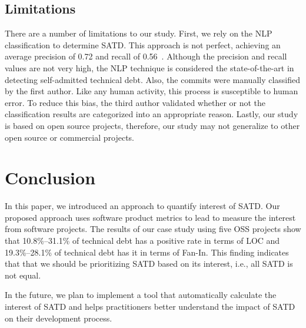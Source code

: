 \documentclass[10pt, conference]{IEEEtran}
\newcommand{\emad}[1]{{\color{red}{\textbf{Emad: [#1]}}}}
\begin{document}

\subsection{Limitations} \label{limitations}
There are a number of limitations to our study. First, we rely on the NLP classification to determine SATD. This approach is not perfect, achieving an average precision of 0.72 and recall of 0.56~\cite{Maldonado_TSE2017}. Although the precision and recall values are not very high, the NLP technique is considered the state-of-the-art in detecting self-admitted technical debt. Also, the commits were manually classified by the first author. Like any human activity, this process is susceptible to human error. To reduce this bias, the third author validated whether or not the classification results are categorized into an appropriate reason. Lastly, our study is based on open source projects, therefore, our study may not generalize to other open source or commercial projects.

\section{Conclusion} \label{sec:conclusion}
In this paper, we introduced an approach to quantify interest of SATD. Our proposed approach uses software product metrics to lead to measure the interest from software projects.
The results of our case study using five OSS projects show that 10.8\%--31.1\% of technical debt has a positive rate in terms of LOC and 19.3\%--28.1\% of technical debt has it in terms of Fan-In. This finding indicates that that we should be prioritizing SATD based on its interest, i.e., all SATD is not equal.

In the future, we plan to implement a tool that automatically calculate 
the interest of SATD and helps practitioners better understand the impact of SATD on their development process.

\balance



\end{document}
